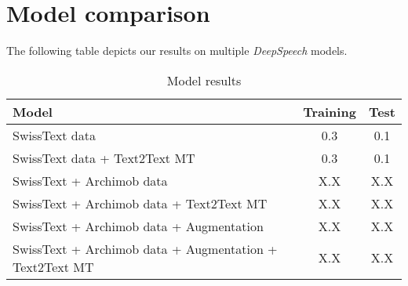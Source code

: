 \section{Model comparison}
The following table depicts our results on multiple \textit{DeepSpeech} models.

\begin{table}[H]\centering
    \begin{tabularx}{\linewidth}{|X|c|c|}
        \hline
        \textbf{Model}                                          & \textbf{Training} & \textbf{Test} \\\hline
        SwissText data                                          & 0.3               & 0.1           \\\hline
        SwissText data + Text2Text MT                           & 0.3               & 0.1           \\\hline
        SwissText + Archimob data                               & X.X               & X.X           \\\hline
        SwissText + Archimob data + Text2Text MT                & X.X               & X.X           \\\hline
        SwissText + Archimob data + Augmentation                & X.X               & X.X           \\\hline
        SwissText + Archimob data + Augmentation + Text2Text MT & X.X               & X.X           \\\hline
    \end{tabularx}
    \caption{Model results}
\end{table}
